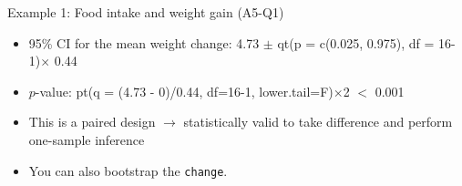 \documentclass[handout]{beamer}\usepackage[]{graphicx}\usepackage[]{color}
\newenvironment{knitrout}{}{} %
\begin{document}
\begin{frame}[fragile]{Example 1: Food intake and weight gain (A5-Q1)}
\begin{minipage}{0.47\textwidth}
\begin{knitrout}
\end{knitrout}

\end{minipage}
\begin{minipage}{0.5\textwidth}
	\pause 
\begin{itemize}
	\small
	\setlength\itemsep{1em}
	\item 95\% CI for the mean weight change: 4.73 $\pm$ qt(p = c(0.025, 0.975), df = 16-1)$\times$ 0.44 
	\item $p$-value: pt(q = (4.73 - 0)/0.44, df=16-1, lower.tail=F)$\times$2 $<$ 0.001 
	\item This is a paired design $\to$ statistically valid to take difference and perform one-sample inference
	\item You can also bootstrap the \texttt{change}.
\end{itemize}
\end{minipage}

\end{frame}
\end{document}
